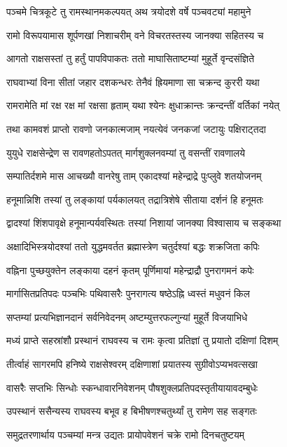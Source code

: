 \twolineshloka
{पञ्चमे चित्रकूटे तु रामस्थानमकल्पयत्}
{अथ त्रयोदशे वर्षे पञ्चवट्यां महामुने}%

\twolineshloka
{रामो विरूपयामास शूर्पणखां निशाचरीम्}
{वने विचरतस्तस्य जानक्या सहितस्य च}%

\twolineshloka
{आगतो राक्षसस्तां तु हर्तुं पापविपाकतः}
{ततो माघासिताष्टम्यां मुहूर्ते वृन्दसंज्ञिते}%

\twolineshloka
{राघवाभ्यां विना सीतां जहार दशकन्धरः}
{तेनैवं ह्रियमाणा सा चक्रन्द कुररी यथा}%

\twolineshloka
{रामरामेति मां रक्ष रक्ष मां रक्षसा हृताम्}
{यथा श्येनः क्षुधाक्रान्तः क्रन्दन्तीं वर्तिकां नयेत्}%

\twolineshloka
{तथा कामवशं प्राप्तो रावणो जनकात्मजाम्}
{नयत्येवं जनकजां जटायुः पक्षिराट्तदा}%

\twolineshloka
{युयुधे राक्षसेन्द्रेण स रावणहतोऽपतत्}
{मार्गशुक्लनवम्यां तु वसन्तीं रावणालये}%

\twolineshloka
{सम्पातिर्दशमे मास आचख्यौ वानरेषु ताम्}
{एकादश्यां महेन्द्राद्रे पुःप्लुवे शतयोजनम्}%

\twolineshloka
{हनूमान्निशि तस्यां तु लङ्कायां पर्यकालयत्}
{तद्रात्रिशेषे सीताया दर्शनं हि हनूमतः}%

\twolineshloka
{द्वादश्यां शिंशपावृक्षे हनूमान्पर्यवस्थितः}
{तस्यां निशायां जानक्या विश्वासाय च सङ्कथा}%

\twolineshloka
{अक्षादिभिस्त्रयोदश्यां ततो युद्धमवर्तत}
{ब्रह्मास्त्रेण चतुर्दश्यां बद्धः शक्रजिता कपिः}%

\twolineshloka
{वह्निना पुच्छयुक्तेन लङ्काया दहनं कृतम्}
{पूर्णिमायां महेन्द्राद्रौ पुनरागमनं कपेः}%

\twolineshloka
{मार्गासितप्रतिपदः पञ्चभिः पथिवासरैः}
{पुनरागत्य षष्ठेऽह्नि ध्वस्तं मधुवनं किल}%

\twolineshloka
{सप्तम्यां प्रत्यभिज्ञानदानं सर्वनिवेदनम्}
{अष्टम्युत्तरफल्गुन्यां मुहूर्ते विजयाभिधे}%

\twolineshloka
{मध्यं प्राप्ते सहस्रांशौ प्रस्थानं राघवस्य च}
{रामः कृत्वा प्रतिज्ञां तु प्रयातो दक्षिणां दिशम्}%

\twolineshloka
{तीर्त्वाहं सागरमपि हनिष्ये राक्षसेश्वरम्}
{दक्षिणाशां प्रयातस्य सुग्रीवोऽप्यभवत्सखा}%

\twolineshloka
{वासरैः सप्तभिः सिन्धोः स्कन्धावारनिवेशनम्}
{पौषशुक्लप्रतिपदस्तृतीयायावदम्बुधेः}%

\twolineshloka
{उपस्थानं ससैन्यस्य राघवस्य बभूव ह}
{बिभीषणश्चतुर्थ्यां तु रामेण सह सङ्गतः}%

\twolineshloka
{समुद्रतरणार्थाय पञ्चम्यां मन्त्र उद्यतः}
{प्रायोपवेशनं चक्रे रामो दिनचतुष्टयम्}%

